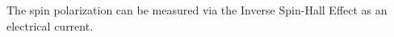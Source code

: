 The spin polarization can be measured via the Inverse Spin-Hall Effect
\cite{ishe-ew,ISHE} as an electrical current.


%

